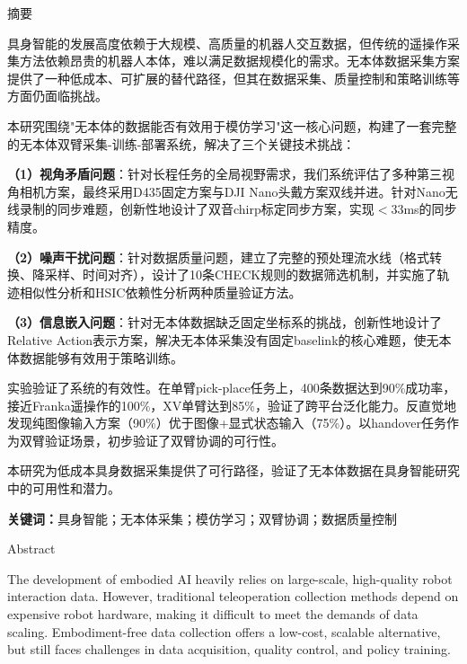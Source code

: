 \begin{center}
{\heiti 摘\quad 要}
\end{center}

具身智能的发展高度依赖于大规模、高质量的机器人交互数据，但传统的遥操作采集方法依赖昂贵的机器人本体，难以满足数据规模化的需求。无本体数据采集方案提供了一种低成本、可扩展的替代路径，但其在数据采集、质量控制和策略训练等方面仍面临挑战。

本研究围绕"无本体的数据能否有效用于模仿学习"这一核心问题，构建了一套完整的无本体双臂采集-训练-部署系统，解决了三个关键技术挑战：

\textbf{（1）视角矛盾问题}：针对长程任务的全局视野需求，我们系统评估了多种第三视角相机方案，最终采用D435固定方案与DJI Nano头戴方案双线并进。针对Nano无线录制的同步难题，创新性地设计了双音chirp标定同步方案，实现$<$33ms的同步精度。

\textbf{（2）噪声干扰问题}：针对数据质量问题，建立了完整的预处理流水线（格式转换、降采样、时间对齐），设计了10条CHECK规则的数据筛选机制，并实施了轨迹相似性分析和HSIC依赖性分析两种质量验证方法。

\textbf{（3）信息嵌入问题}：针对无本体数据缺乏固定坐标系的挑战，创新性地设计了Relative Action表示方案，解决无本体采集没有固定baselink的核心难题，使无本体数据能够有效用于策略训练。

实验验证了系统的有效性。在单臂pick-place任务上，400条数据达到90\%成功率，接近Franka遥操作的100\%，XV单臂达到85\%，验证了跨平台泛化能力。反直觉地发现纯图像输入方案（90\%）优于图像+显式状态输入（75\%）。以handover任务作为双臂验证场景，初步验证了双臂协调的可行性。

本研究为低成本具身数据采集提供了可行路径，验证了无本体数据在具身智能研究中的可用性和潜力。

\vspace{1em}
\noindent\textbf{关键词：}具身智能；无本体采集；模仿学习；双臂协调；数据质量控制

\newpage

\begin{center}
{\heiti Abstract}
\end{center}

The development of embodied AI heavily relies on large-scale, high-quality robot interaction data. However, traditional teleoperation collection methods depend on expensive robot hardware, making it difficult to meet the demands of data scaling. Embodiment-free data collection offers a low-cost, scalable alternative, but still faces challenges in data acquisition, quality control, and policy training.

